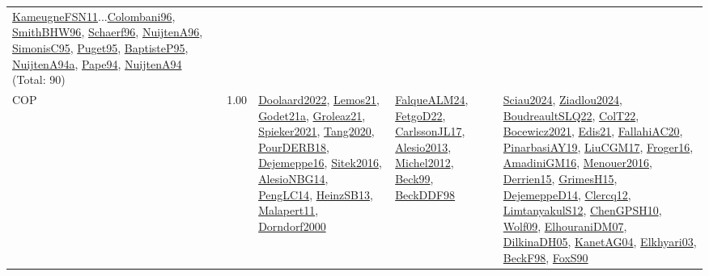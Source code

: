 {\begin{longtable}{p{3cm}r>{\raggedright\arraybackslash}p{6cm}>{\raggedright\arraybackslash}p{6cm}>{\raggedright\arraybackslash}p{8cm}}
\hyperref[detail:KameugneFSN11]{KameugneFSN11}...\hyperref[detail:Colombani96]{Colombani96}, \hyperref[detail:SmithBHW96]{SmithBHW96}, \hyperref[detail:Schaerf96]{Schaerf96}, \hyperref[detail:NuijtenA96]{NuijtenA96}, \hyperref[detail:SimonisC95]{SimonisC95}, \hyperref[detail:Puget95]{Puget95}, \hyperref[detail:BaptisteP95]{BaptisteP95}, \hyperref[detail:NuijtenA94a]{NuijtenA94a}, \hyperref[detail:Pape94]{Pape94}, \hyperref[detail:NuijtenA94]{NuijtenA94} (Total: 90)\\
\index{COP}\index{CP!COP}COP &  1.00 & \hyperref[detail:Doolaard2022]{Doolaard2022}, \hyperref[detail:Lemos21]{Lemos21}, \hyperref[detail:Godet21a]{Godet21a}, \hyperref[detail:Groleaz21]{Groleaz21}, \hyperref[detail:Spieker2021]{Spieker2021}, \hyperref[detail:Tang2020]{Tang2020}, \hyperref[detail:PourDERB18]{PourDERB18}, \hyperref[detail:Dejemeppe16]{Dejemeppe16}, \hyperref[detail:Sitek2016]{Sitek2016}, \hyperref[detail:AlesioNBG14]{AlesioNBG14}, \hyperref[detail:PengLC14]{PengLC14}, \hyperref[detail:HeinzSB13]{HeinzSB13}, \hyperref[detail:Malapert11]{Malapert11}, \hyperref[detail:Dorndorf2000]{Dorndorf2000} & \hyperref[detail:FalqueALM24]{FalqueALM24}, \hyperref[detail:FetgoD22]{FetgoD22}, \hyperref[detail:CarlssonJL17]{CarlssonJL17}, \hyperref[detail:Alesio2013]{Alesio2013}, \hyperref[detail:Michel2012]{Michel2012}, \hyperref[detail:Beck99]{Beck99}, \hyperref[detail:BeckDDF98]{BeckDDF98} & \hyperref[detail:Sciau2024]{Sciau2024}, \hyperref[detail:Ziadlou2024]{Ziadlou2024}, \hyperref[detail:BoudreaultSLQ22]{BoudreaultSLQ22}, \hyperref[detail:ColT22]{ColT22}, \hyperref[detail:Bocewicz2021]{Bocewicz2021}, \hyperref[detail:Edis21]{Edis21}, \hyperref[detail:FallahiAC20]{FallahiAC20}, \hyperref[detail:PinarbasiAY19]{PinarbasiAY19}, \hyperref[detail:LiuCGM17]{LiuCGM17}, \hyperref[detail:Froger16]{Froger16}, \hyperref[detail:AmadiniGM16]{AmadiniGM16}, \hyperref[detail:Menouer2016]{Menouer2016}, \hyperref[detail:Derrien15]{Derrien15}, \hyperref[detail:GrimesH15]{GrimesH15}, \hyperref[detail:DejemeppeD14]{DejemeppeD14}, \hyperref[detail:Clercq12]{Clercq12}, \hyperref[detail:LimtanyakulS12]{LimtanyakulS12}, \hyperref[detail:ChenGPSH10]{ChenGPSH10}, \hyperref[detail:Wolf09]{Wolf09}, \hyperref[detail:ElhouraniDM07]{ElhouraniDM07}, \hyperref[detail:DilkinaDH05]{DilkinaDH05}, \hyperref[detail:KanetAG04]{KanetAG04}, \hyperref[detail:Elkhyari03]{Elkhyari03}, \hyperref[detail:BeckF98]{BeckF98}, \hyperref[detail:FoxS90]{FoxS90}\\

\end{longtable}}

